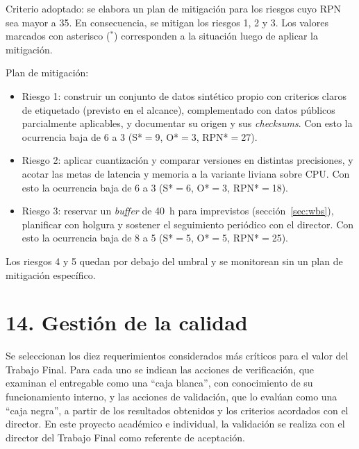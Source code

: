 \documentclass[
11pt, %
]{charter}
\begin{document}
Criterio adoptado: se elabora un plan de mitigación para los riesgos cuyo RPN sea mayor a 35. En consecuencia, se mitigan los riesgos 1, 2 y 3. Los valores marcados con asterisco ($^{*}$) corresponden a la situación luego de aplicar la mitigación.

Plan de mitigación:
\begin{itemize}
	\item Riesgo 1: construir un conjunto de datos sintético propio con criterios claros de etiquetado (previsto en el alcance), complementado con datos públicos parcialmente aplicables, y documentar su origen y sus \textit{checksums}. Con esto la ocurrencia baja de 6 a 3 (S*${}={}$9, O*${}={}$3, RPN*${}={}$27).
	\item Riesgo 2: aplicar cuantización y comparar versiones en distintas precisiones, y acotar las metas de latencia y memoria a la variante liviana sobre CPU. Con esto la ocurrencia baja de 6 a 3 (S*${}={}$6, O*${}={}$3, RPN*${}={}$18).
	\item Riesgo 3: reservar un \textit{buffer} de 40~h para imprevistos (sección~\ref{sec:wbs}), planificar con holgura y sostener el seguimiento periódico con el director. Con esto la ocurrencia baja de 8 a 5 (S*${}={}$5, O*${}={}$5, RPN*${}={}$25).
\end{itemize}

Los riesgos 4 y 5 quedan por debajo del umbral y se monitorean sin un plan de mitigación específico.


\section{14. Gestión de la calidad}
\label{sec:calidad}

Se seleccionan los diez requerimientos considerados más críticos para el valor del Trabajo Final. Para cada uno se indican las acciones de verificación, que examinan el entregable como una ``caja blanca'', con conocimiento de su funcionamiento interno, y las acciones de validación, que lo evalúan como una ``caja negra'', a partir de los resultados obtenidos y los criterios acordados con el director. En este proyecto académico e individual, la validación se realiza con el director del Trabajo Final como referente de aceptación.
\end{document}
